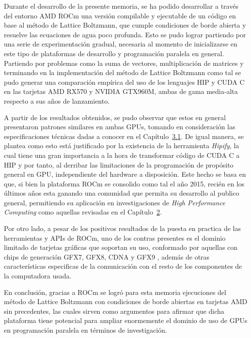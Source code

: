 
Durante el desarrollo de la presente memoria, se ha podido desarrollar a través del entorno AMD ROCm una versión compilable y ejecutable de un código en base al método de Lattice Boltzmann, que cumple condiciones de borde abierta y resuelve las ecuaciones de agua poco profunda.
Esto se pudo lograr partiendo por una serie de experimentación gradual, necesaria al momento de inicializarse en este tipo de plataformas de desarrollo y programación paralela en general.
Partiendo por problemas como la suma de vectores, multiplicación de matrices y terminando en la implementación del método de Lattice Boltzmann como tal se pudo generar una comparación empírica del uso de los lenguajes HIP y CUDA C en las tarjetas AMD RX570 y NVIDIA GTX960M, ambas de gama media-alta respecto a sus años de lanzamiento.

A partir de los resultados obtenidos, se pudo observar que estos en general presentaron patrones similares en ambas GPUs, tomando en consideración las especificaciones técnicas dadas a conocer en el Capítulo~\hyperref[sec:3.1]{3.1}.
De igual manera, se plantea como esto está justificado por la existencia de la herramienta \textit{Hipify}, la cual tiene una gran importancia a la hora de transformar código de CUDA C a HIP y por tanto, al derribar las limitaciones de la programación de propósito general en GPU, independiente del hardware a disposición.
Este hecho se basa en que, si bien la plataforma ROCm se consolido como tal el año 2015, recién en los últimos años esta ganando una comunidad que permita su desarrollo al publico general, permitiendo su aplicación en investigaciones de \textit{High Performance Computing} como aquellas revisadas en el Capítulo~\hyperref[sec:2]{2}.

Por otro lado, a pesar de los positivos resultados de la puesta en practica de las herramientas y APIs de ROCm, uno de los contras presentes es el dominio limitado de tarjetas gráficas que soportan su uso, conformado por aquellas con chips de generación GFX7, GFX8, CDNA y GFX9 \cite{supportGPU}, además de otras características especificas de la comunicación con el resto de los componentes de la computadora usada.

En conclusión, gracias a ROCm se logró para esta memoria ejecuciones del método de Lattice Boltzmann con condiciones de borde abiertas en tarjetas AMD sin precedentes, las cuales sirven como argumentos para afirmar que dicha plataforma tiene potencial para ampliar enormemente el dominio de uso de GPUs en programación paralela en términos de investigación.
